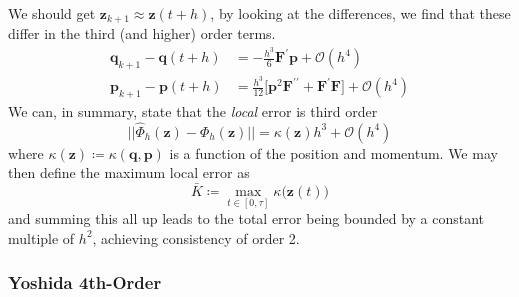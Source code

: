 \documentclass{article}
\begin{document}
      We should get $\mathbf{z}_{k+1} \approx \mathbf{z}(t + h)$, by looking at the differences, we find that these differ in the third (and higher) order terms. 
      \begin{align*}
        \mathbf{q}_{k+1} - \mathbf{q}(t + h) & = - \frac{h^3}{6} \mathbf{F}^\prime \mathbf{p} + \mathcal{O}(h^4) \\
        \mathbf{p}_{k+1} - \mathbf{p}(t + h) & = \frac{h^3}{12} \big[ \mathbf{p}^2 \mathbf{F}^{\prime\prime} + \mathbf{F}^\prime \mathbf{F} \big] + \mathcal{O}(h^4)
      \end{align*}
      We can, in summary, state that the \textit{local} error is third order
      \begin{equation}
        ||\hat{\Phi}_h (\mathbf{z}) - \Phi_h (\mathbf{z})|| = \kappa(\mathbf{z}) h^3 + \mathcal{O}(h^4)
      \end{equation}
      where $\kappa(\mathbf{z}) \coloneqq \kappa(\mathbf{q}, \mathbf{p})$ is a function of the position and momentum. We may then define the maximum local error as 
      \begin{equation}
        \bar{K} \coloneqq \max_{t \in [0, \tau]} \kappa \big(\mathbf{z}(t)\big)
      \end{equation}
      and summing this all up leads to the total error being bounded by a constant multiple of $h^2$, achieving consistency of order 2. 

    \subsubsection{Yoshida 4th-Order}
\end{document}
